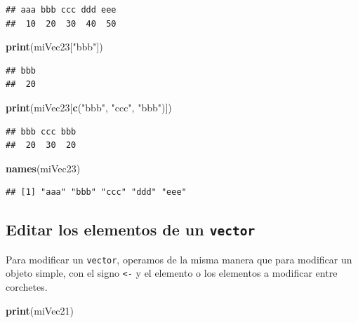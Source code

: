 \documentclass[
]{book}
\newenvironment{Shaded}{\begin{snugshade}}{\end{snugshade}}
\newcommand{\KeywordTok}[1]{\textcolor[rgb]{0.13,0.29,0.53}{\textbf{#1}}}
\newcommand{\NormalTok}[1]{#1}
\newcommand{\StringTok}[1]{\textcolor[rgb]{0.31,0.60,0.02}{#1}}
\begin{document}
\begin{verbatim}
## aaa bbb ccc ddd eee 
##  10  20  30  40  50
\end{verbatim}

\begin{Shaded}
\begin{Highlighting}[]
\KeywordTok{print}\NormalTok{(miVec23[}\StringTok{"bbb"}\NormalTok{])}
\end{Highlighting}
\end{Shaded}

\begin{verbatim}
## bbb 
##  20
\end{verbatim}

\begin{Shaded}
\begin{Highlighting}[]
\KeywordTok{print}\NormalTok{(miVec23[}\KeywordTok{c}\NormalTok{(}\StringTok{"bbb"}\NormalTok{, }\StringTok{"ccc"}\NormalTok{, }\StringTok{"bbb"}\NormalTok{)])}
\end{Highlighting}
\end{Shaded}

\begin{verbatim}
## bbb ccc bbb 
##  20  30  20
\end{verbatim}

\begin{Shaded}
\begin{Highlighting}[]
\KeywordTok{names}\NormalTok{(miVec23)}
\end{Highlighting}
\end{Shaded}

\begin{verbatim}
## [1] "aaa" "bbb" "ccc" "ddd" "eee"
\end{verbatim}

\hypertarget{editar-los-elementos-de-un-vector}{%
\subsection{\texorpdfstring{Editar los elementos de un \texttt{vector}}{Editar los elementos de un vector}}\label{editar-los-elementos-de-un-vector}}

Para modificar un \texttt{vector}, operamos de la misma manera que para modificar un objeto simple, con el signo \texttt{\textless{}-} y el elemento o los elementos a modificar entre corchetes.

\begin{Shaded}
\begin{Highlighting}[]
\KeywordTok{print}\NormalTok{(miVec21)}
\end{Highlighting}
\end{Shaded}
\end{document}
